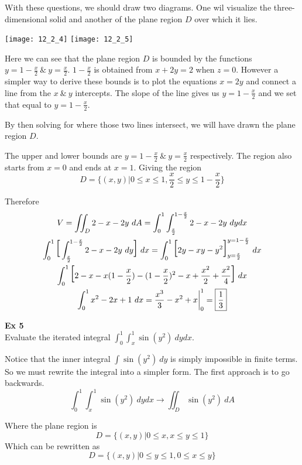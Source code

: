 \documentclass{article}
\begin{document}
  With these questions, we should draw two diagrams. One wil visualize the three-dimensional solid and another of the plane region $ D $ over which it lies.
  \begin{center}
    \texttt{[image: 12\_2\_4]} \texttt{[image: 12\_2\_5]}
  \end{center}

  Here we can see that the plane region $ D $ is bounded by the functions $ y=1-\frac{x}{2} ~\&~ y=\frac{x}{2} $. $ 1-\frac{x}{2} $ is obtained from $ x+2y=2 $ when $ z=0 $. However a simpler way to derive these bounds is to plot the equations $ x=2y $ and connect a line from the $ x ~\&~ y $ intercepts. The slope of the line gives us $ y=1-\frac{x}{2} $ and we set that equal to $ y=1-\frac{x}{2} $. 

  By then solving for where those two lines intersect, we will have drawn the plane region $ D $.

  The upper and lower bounds are $ y=1-\frac{x}{2} ~\&~ y=\frac{x}{2} $ respectively. The region also starts from $ x=0 $ and ends at $ x=1 $. Giving the region
  \[
    D= \{ (x,y) | 0 \le x \le 1, \frac{x}{2} \le y \le 1 - \frac{x}{2} \}
  \]

  Therefore
  \[
    \begin{gathered}
    V = \iint_D 2-x-2y~dA = \int^{1}_{0} \int^{1-\frac{x}{2}}_{\frac{x}{2}} 2-x-2y ~ dydx\\
    \int^{1}_{0} \text{\huge{[}} \int^{1-\frac{x}{2}}_{\frac{x}{2}} 2-x-2y ~ dy \text{\huge{]}}~dx = \int^{1}_{0} \text{\huge{[}} 2y-xy-y^{2} \text{\huge{]}}^{y=1-\frac{x}{2}}_{y=\frac{x}{2}}~dx\\
    \int^{1}_{0} \text{\huge{[}} 2-x-x(1-\frac{x}{2}) - (1-\frac{x}{2})^{2} - x + \frac{x^{2}}{2} + \frac{x^{2}}{4}\text{\huge{]}}~dx\\
    \int^{1}_{0} x^{2}-2x+1~dx = \frac{x^{3}}{3}-x^{2}+x \bigg|^{1}_0= \boxed{\frac{1}{3}}
    \end{gathered}
  \]
 
  \textbf{Ex 5}\\
  Evaluate the iterated integral $ \int^{1}_{0} \int^{1}_{x} \sin(y^{2}) ~ dydx $.

  Notice that the inner integral $ \int \sin(y^{2})~dy $ is simply impossible in finite terms. So we must rewrite the integral into a simpler form. The first approach is to go backwards.
  \[
   \int^{1}_{0} \int^{1}_{x} \sin(y^{2}) ~ dydx \to \iint_D \sin(y^{2})~dA   
  \]

  Where the plane region is
  \[
    D = \{ (x,y) | 0 \le x, x \le y \le 1 \}
  \]
  Which can be rewritten as
  \[
    D = \{ (x,y) | 0 \le y \le 1, 0 \le x \le y \}
  \]
\end{document}
